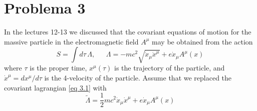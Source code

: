 \documentclass[]{article}
\numberwithin{equation}{section}
\newcommand{\0}{\textcolor{gray}{0}}
\newcommand{\ltd}[2]{d #1/d #2}
\begin{document}
\section{Problema 3}
In the lectures 12-13 we discussed that the covariant equations of motion for the massive particle in the electromagnetic field $A^\mu$ may be obtained from the action
\begin{equation}
	S = \int d\tau \, \Lambda, ~~~~~~~ \Lambda = -mc^2 \sqrt{\dot{x}_\mu \dot{x}^\mu} + e \dot{x}_\mu A^\mu (x) \label{eq 3.1}
\end{equation}
where $\tau$ is the proper time, $x^\mu (\tau)$ is the trajectory of the particle, and $\dot{x}^\mu = \ltd{x^\mu}{\tau}$ is the 4-velocity of the particle. Assume that we replaced the covariant lagrangian \ref{eq 3.1} with
\begin{equation}
	\tilde{\Lambda} = \frac{1}{2} mc^2 \dot{x}_\mu \dot{x}^\mu + e\dot{x}_\mu A^\mu (x) \label{eq 3.2}
\end{equation}
\end{document}
